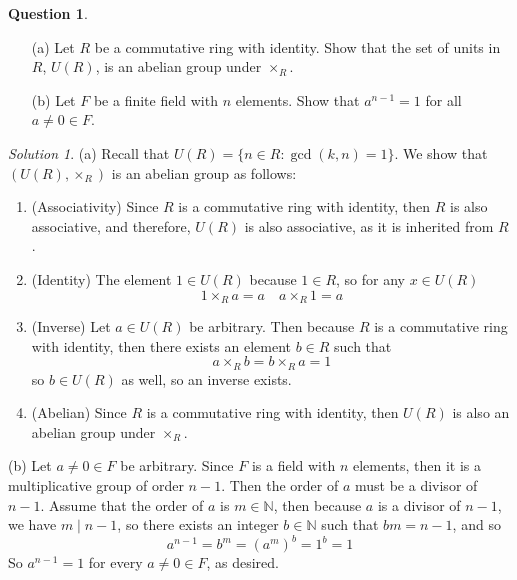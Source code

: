 \documentclass[11pt]{amsart}
\theoremstyle{definition}\newtheorem{question}{Question}
\theoremstyle{definition}\newtheorem{claim}{Claim}
\theoremstyle{remark}\newtheorem*{solution}{Solution}
\newcommand{\N}{\mathbb{N}}
\begin{document}
\newpage

\begin{question}
    \begin{itemize}
        \item[(a)] Let $R$ be a commutative ring with identity. Show that the set of units in $R$, $U(R)$, is an abelian group under $\times_R$.
        \item[(b)] Let $F$ be a finite field with $n$ elements. Show that $a^{n - 1} = 1$ for all $a \neq 0 \in F$.
    \end{itemize}
\end{question}

\begin{solution}
    (a) Recall that $U(R) = \{n \in R : \gcd(k, n) = 1\}$. We show that $(U(R), \times_R)$ is an abelian group as follows:
    \begin{enumerate}
        \item (Associativity) Since $R$ is a commutative ring with identity, then $R$ is also associative, and therefore, $U(R)$ is also associative, as it is inherited from $R$.
        \item (Identity) The element $1 \in U(R)$ because $1 \in R$, so for any $x \in U(R)$
        \begin{equation*}
            1 \times_R a = a \quad a \times_R 1 = a
        \end{equation*}
        \item (Inverse) Let $a \in U(R)$ be arbitrary. Then because $R$ is a commutative ring with identity, then there exists an element $b \in R$ such that
        \begin{equation*}
            a \times_R b = b \times_R a = 1
        \end{equation*}
        so $b \in U(R)$ as well, so an inverse exists.
        \item (Abelian) Since $R$ is a commutative ring with identity, then $U(R)$ is also an abelian group under $\times_R$.
    \end{enumerate}

    (b) Let $a \neq 0 \in F$ be arbitrary. Since $F$ is a field with $n$ elements, then it is a multiplicative group of order $n - 1$. Then the order of $a$ must be a divisor of $n - 1$. Assume that the order of $a$ is $m \in \N$, then because $a$ is a divisor of $n - 1$, we have $m \mid n - 1$, so there exists an integer $b \in \N$ such that $bm = n - 1$, and so
    \begin{equation*}
        a^{n - 1} = b^m = (a^m)^b = 1^b = 1
    \end{equation*}
    So $a^{n - 1} = 1$ for every $a \neq 0 \in F$, as desired.
\end{solution}
\end{document}
